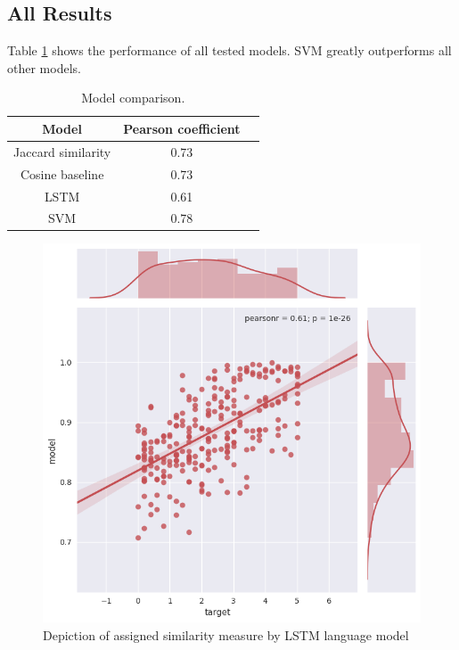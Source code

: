 \documentclass[10pt, a4paper]{article}
\begin{document}
\subsection{All Results}

Table \ref{tab:all_results} shows the performance of all tested models.
SVM greatly outperforms all other models.

\begin{table}
	\caption{Model comparison.}
\label{tab:all_results}
\begin{center}
\begin{tabular}{ccc}
\toprule
Model & Pearson coefficient \\
\midrule
Jaccard similarity & 0.73 \\
Cosine baseline & 0.73 \\
LSTM & 0.61 \\
SVM & 0.78 \\
\bottomrule
\end{tabular}
\end{center}
\end{table}


\newpage
\begin{figure}
	\begin{center}
	\includegraphics[width=\columnwidth]{lstm_corr.png}
	\caption{Depiction of assigned similarity measure by LSTM language model}
	\label{fig:lstm_corr}
	\end{center}
\end{figure}
\end{document}
